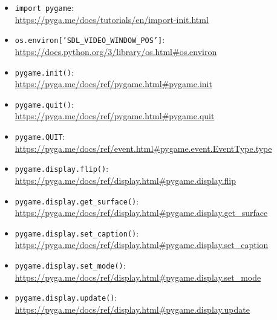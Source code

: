 \begin{itemize}
	\item \texttt{import pygame}:\\ \url{https://pyga.me/docs/tutorials/en/import-init.html}
	
	\item \texttt{os.environ['SDL\_VIDEO\_WINDOW\_POS']}:
    \\
	\url{https://docs.python.org/3/library/os.html#os.environ}
	
	\item \texttt{pygame.init()}:
	\\
	\url{https://pyga.me/docs/ref/pygame.html#pygame.init}
	
	\item \texttt{pygame.quit()}:
	\\
	\url{https://pyga.me/docs/ref/pygame.html#pygame.quit}

	\item \texttt{pygame.QUIT}:
	\\
    \url{https://pyga.me/docs/ref/event.html#pygame.event.EventType.type}
	
	\item \texttt{pygame.display.flip()}:
	\\
	\url{https://pyga.me/docs/ref/display.html#pygame.display.flip}
	
	\item \texttt{pygame.display.get\_surface()}:
	\\
	\url{https://pyga.me/docs/ref/display.html#pygame.display.get_surface}

	\item \texttt{pygame.display.set\_caption()}:
	\\
	\url{https://pyga.me/docs/ref/display.html#pygame.display.set_caption}

	\item \texttt{pygame.display.set\_mode()}:
	\\
	\url{https://pyga.me/docs/ref/display.html#pygame.display.set_mode}
	
	\item \texttt{pygame.display.update()}:
	\\
	\url{https://pyga.me/docs/ref/display.html#pygame.display.update}
	

\end{itemize}
